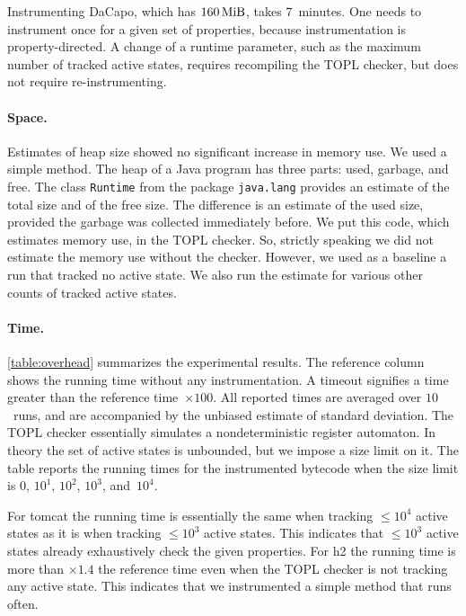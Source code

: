 \documentclass[9pt, preprint]{sigplanconf} %
\theoremstyle{definition}
\theoremstyle{remark}
\begin{document}
Instrumenting DaCapo, which has $160\rm\,MiB$, takes $7$~minutes.
One needs to instrument once for a given set of properties, because instrumentation is property-directed.
A change of a runtime parameter, such as the maximum number of tracked active states, requires recompiling the TOPL checker, but does not require re-instrumenting.

\paragraph{Space.}
Estimates of heap size showed no significant increase in memory use.
We used a simple method.
The heap of a Java program has three parts: used, garbage, and free.
The class {\tt Runtime} from the package {\tt java.lang} provides an estimate of the total size and of the free size.
The difference is an estimate of the used size, provided the garbage was collected immediately before.
We put this code, which estimates memory use, in the TOPL checker.
So, strictly speaking we did not estimate the memory use without the checker.
However, we used as a baseline a run that tracked no active state.
We also run the estimate for various other counts of tracked active states.

\paragraph{Time.}
\autoref{table:overhead} summarizes the experimental results.
The reference column shows the running time without any instrumentation.
A timeout signifies a time greater than the reference time~$\times100$.
All reported times are averaged over $10$~runs, and are accompanied by the unbiased estimate of standard deviation.
The TOPL checker essentially simulates a nondeterministic register automaton.
In theory the set of active states is unbounded, but we impose a size limit on it.
The table reports the running times for the instrumented bytecode when the size limit is $0$, $10^1$, $10^2$, $10^3$, and~$10^4$.

For tomcat the running time is essentially the same when tracking $\le10^4$ active states as it is when tracking $\le10^3$ active states.
This indicates that $\le10^3$ active states already exhaustively check the given properties.
For h2 the running time is more than $\times1.4$ the reference time even when the TOPL checker is not tracking any active state.
This indicates that we instrumented a simple method that runs often.
\end{document}
